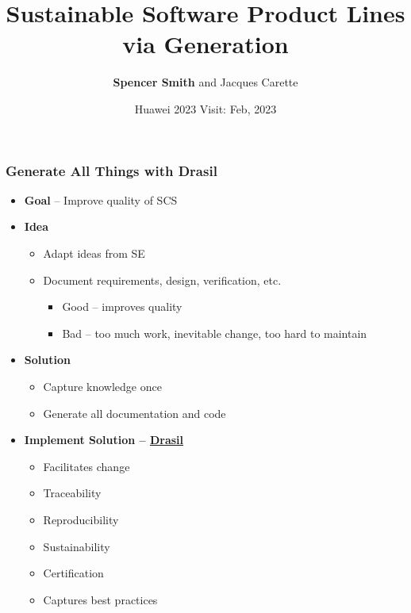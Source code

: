 \documentclass{beamer}
\title {Sustainable Software Product Lines via Generation}
\author{\textbf{Spencer Smith} and Jacques Carette}
\institute[McMaster University]
{
  Computing and Software Department\\
  Faculty of Engineering\\
  McMaster University
}
\date {Huawei 2023 Visit: Feb, 2023}
\begin{document}

\begin{frame}[plain]

\titlepage


\end{frame}


\begin{frame}

\frametitle{Generate All Things with Drasil}

\begin{itemize}
\item \textbf{Goal} -- Improve quality of SCS
\item \textbf{Idea}
  \begin{itemize}
  \item Adapt ideas from SE
  \item Document requirements, design, verification, etc.
    \begin{itemize}
    \item Good -- improves quality
    \item Bad -- too much work, inevitable change, too hard to maintain
    \end{itemize}
  \end{itemize}
\item \textbf{Solution}
\begin{itemize}
\item Capture knowledge once
\item Generate all documentation and code
\end{itemize}
\item \textbf{Implement Solution --
    \href{https://github.com/JacquesCarette/Drasil} {Drasil}}
  \begin{itemize}
  \item Facilitates change
  \item Traceability
  \item Reproducibility
  \item Sustainability
  \item Certification
  \item Captures best practices
  \end{itemize}
\end{itemize}

\end{frame}
\end{document}

